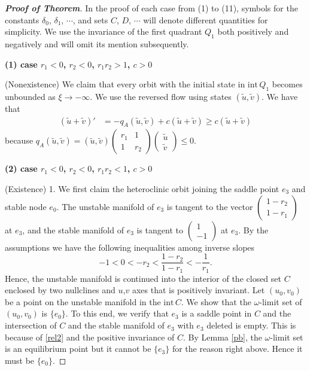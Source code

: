 \documentclass{amsart}
\theoremstyle{definition}
\numberwithin{equation}{section}
\def\ii{{\textrm{int}}\,}
\begin{document}
\begin{proof}[\textbf{Proof of Theorem}] In the proof of each case from (1) to (11), symbols for the constants $\delta_0$, $\delta_1$, $\cdots$, and sets $C$, $D$, $\cdots$ will denote different quantities for simplicity. We use the invariance of the first quadrant $Q_1$ both positively and negatively and will omit its mention subsequently. 

\bigskip

\textbf{(1) \boldmath case $r_1<0$, $r_2<0$, $r_1r_2>1$, $c>0$}

\bigskip
(Nonexistence) We claim that every orbit with the initial state in $\ii Q_1$ becomes unbounded as $\xi \rightarrow -\infty.$ We use the reversed flow using states $(\tilde u, \tilde v)$. We have that
\begin{align*}
  (\tilde u+\tilde v)' &= - q_A(\tilde u ,\tilde v) + c(\tilde u+\tilde v) \ge c(\tilde u+\tilde v) 
 \end{align*}
because $q_A(\tilde u, \tilde v) = (\tilde u, \tilde v) \begin{pmatrix} r_1 & 1 \\ 1 & r_2 \end{pmatrix}\begin{pmatrix} \tilde u \\ \tilde v \end{pmatrix} \le 0$.
\bigskip

\textbf{(2) \boldmath case $r_1<0$, $r_2<0$, $r_1r_2<1$, $c>0$}

\bigskip
(Existence) 1. We first claim the heteroclinic orbit joining the saddle point $e_3$ and stable node $e_0$. The unstable manifold of $e_3$ is tangent to the vector $\begin{pmatrix} 1-r_2 \\ 1-r_1 \end{pmatrix}$ at $e_3$, and the stable manifold of $e_3$ is tangent to $\begin{pmatrix} 1 \\ -1 \end{pmatrix}$ at $e_3$. By the assumptions we have the following inequalities among inverse slopes
\begin{equation} \label{rel2}
 -1<0<-r_2 < \frac{1-r_2}{1-r_1} < -\frac{1}{r_1}.
\end{equation}
Hence, the unstable manifold is continued into the interior of the closed set $C$ enclosed by two nullclines and $u$,$v$ axes that is positively invariant. Let $(u_0,v_0)$ be a point on the unstable manifold in the $\ii C$. We show that the $\omega$-limit set of $(u_0,v_0)$ is $\{e_0\}$. To this end, we verify that $e_3$ is a saddle point in $C$ and the intersection of $C$ and the stable manifold of $e_3$ with $e_3$ deleted is empty. This is because of \eqref{rel2} and the positive invariance of $C$. By Lemma \ref{pb}, the $\omega$-limit set is an equilibrium point but it cannot be $\{e_3\}$ for the reason right above. Hence it must be $\{e_0\}$.


\end{proof}
\end{document}

